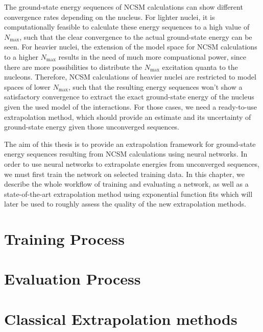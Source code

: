 The ground-state energy sequences of NCSM calculations can show different convergence rates depending on the nucleus. For lighter nuclei, it is computationally feasible to calculate these energy sequences to a high value of $N_\mathrm{max}$, such that the clear convergence to the actual ground-state energy can be seen. For heavier nuclei, the extension of the model space for NCSM calculations to a higher $N_\mathrm{max}$ results in the need of much more compuational power, since there are more possibilities to distribute the $N_\mathrm{max}$ excitation quanta to the nucleons. Therefore, NCSM calculations of heavier nuclei are restricted to model spaces of lower $N_\mathrm{max}$, such that the resulting energy sequences won't show a satisfactory convergence to extract the exact ground-state energy of the nucleus given the used model of the interactions. For those cases, we need a ready-to-use extrapolation method, which should provide an estimate and its uncertainty of ground-state energy given those unconverged sequences.

The aim of this thesis is to provide an extrapolation framework for ground-state energy sequences resulting from NCSM calculations using neural networks. In order to use neural networks to extrapolate energies from unconverged sequences, we must first train the network on selected training data. In this chapter, we describe the whole workflow of training and evaluating a network, as well as a state-of-the-art extrapolation method using exponential function fits which will later be used to roughly assess the quality of the new extrapolation methods.

\section{Training Process}

\section{Evaluation Process}

\section{Classical Extrapolation methods}

